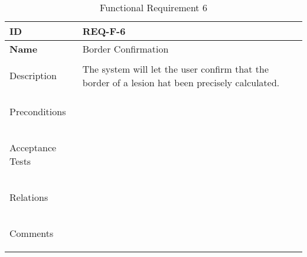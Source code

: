 \begin{table}[H]
    \begin{tabular}[t]{ | >{\bfseries}l | p{9.5cm} |}

    \hline
    ID
    &  REQ-F-6 \\ \hline

    Name
    & Border Confirmation \\ \hline

    Description
    & The system will let the user confirm that the border of a lesion hat been precisely calculated. \\ \hline

    Preconditions
    &  \\ \hline

    Acceptance Tests
    & \\ \hline

    Relations
    &  \\ \hline

    Comments
    &  \\ \hline

    \end{tabular}

    \caption{Functional Requirement 6}
    \label{fig:req_f_6}

\end{table}